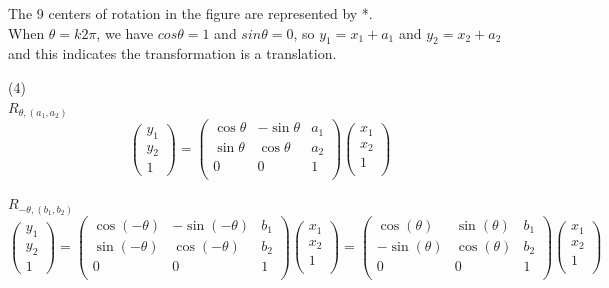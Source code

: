 \documentclass[12pt]{article}
\begin{document}
\medskip
The 9 centers of rotation in the figure are represented by *.\\
When $\theta = k2\pi$, we have $cos\theta=1$ and $sin\theta=0$, 
so $y_1 = x_1 + a_1$ and $y_2=x_2 + a_2$ and this indicates the transformation is a translation.

\medskip
(4) \\

$R_{\theta, (a_1,a_2)}$ \\
\[
\begin{pmatrix}
y_1 \\
y_2 \\
1
\end{pmatrix}
=
\begin{pmatrix}
\cos\theta & -\sin\theta & a_1 \\
\sin\theta & \cos\theta & a_2 \\
0 & 0 & 1 \\
\end{pmatrix}
\begin{pmatrix}
x_1 \\
x_2 \\
1 \\
\end{pmatrix}
\]

$R_{-\theta, (b_1,b_2)}$ \\
\[
\begin{pmatrix}
y_1 \\
y_2 \\
1
\end{pmatrix}
=
\begin{pmatrix}
\cos(-\theta) & -\sin(-\theta) & b_1 \\
\sin(-\theta) & \cos(-\theta) & b_2 \\
0 & 0 & 1 \\
\end{pmatrix}
\begin{pmatrix}
x_1 \\
x_2 \\
1 \\
\end{pmatrix}
=
\begin{pmatrix}
\cos(\theta) & \sin(\theta) & b_1 \\
-\sin(\theta) & \cos(\theta) & b_2 \\
0 & 0 & 1 \\
\end{pmatrix}
\begin{pmatrix}
x_1 \\
x_2 \\
1 \\
\end{pmatrix}
\] \\
\end{document}
